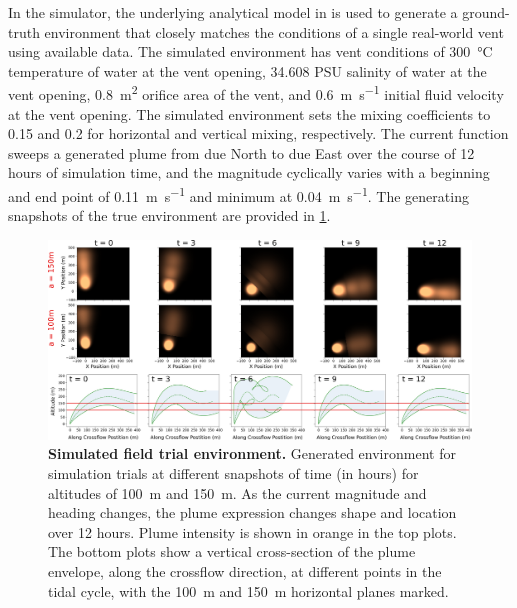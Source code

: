 In the simulator, the underlying analytical model in \PHUMES is used to generate a ground-truth environment that closely matches the conditions of a single real-world vent using available data. The simulated environment has vent conditions of \SI{300}{\celsius} temperature of water at the vent opening, 34.608 PSU salinity of water at the vent opening, \SI{0.8}{\meter\squared} orifice area of the vent, and \SI{0.6}{\meter\per\second} initial fluid velocity at the vent opening. The simulated environment sets the mixing coefficients to 0.15 and 0.2 for horizontal and vertical mixing, respectively. The current function sweeps a generated plume from due North to due East over the course of 12 hours of simulation time, and the magnitude cyclically varies with a beginning and end point of \SI{0.11}{\meter\per\second} and minimum at \SI{0.04}{\meter\per\second}. The generating snapshots of the true environment are provided in \cref{fig:sim_env}.

\begin{figure}
    \centering
    \includegraphics[width=1\columnwidth]{figures/sim_env.png}
    \caption[Simulated field trial environment.]{\textbf{Simulated field trial environment.} Generated environment for simulation trials at different snapshots of time (in hours) for altitudes of \SI{100}{\meter} and \SI{150}{\meter}. As the current magnitude and heading changes, the plume expression changes shape and location over 12 hours. Plume intensity is shown in orange in the top plots. The bottom plots show a vertical cross-section of the plume envelope, along the crossflow direction, at different points in the tidal cycle, with the \SI{100}{\meter} and \SI{150}{\meter} horizontal planes marked.}
    \label{fig:sim_env}
\end{figure}

